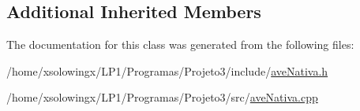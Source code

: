\subsection*{Additional Inherited Members}


The documentation for this class was generated from the following files\+:\begin{DoxyCompactItemize}
\item 
/home/xsolowingx/\+L\+P1/\+Programas/\+Projeto3/include/\hyperlink{aveNativa_8h}{ave\+Nativa.\+h}\item 
/home/xsolowingx/\+L\+P1/\+Programas/\+Projeto3/src/\hyperlink{aveNativa_8cpp}{ave\+Nativa.\+cpp}\end{DoxyCompactItemize}
